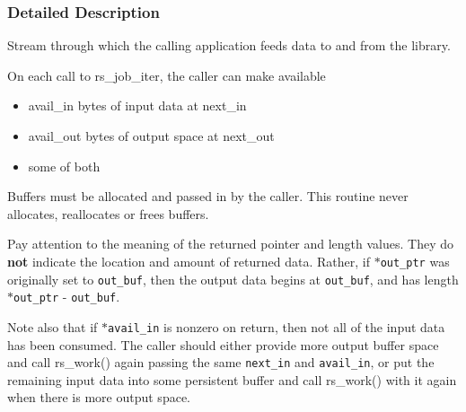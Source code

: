 \subsubsection{Detailed Description}
Stream through which the calling application feeds data to and from the library. 

On each call to rs\_\-job\_\-iter, the caller can make available

\begin{itemize}
\item avail\_\-in bytes of input data at next\_\-in\item avail\_\-out bytes of output space at next\_\-out\item some of both\end{itemize}


Buffers must be allocated and passed in by the caller. This routine never allocates, reallocates or frees buffers.

Pay attention to the meaning of the returned pointer and length values. They do {\bf not} indicate the location and amount of returned data. Rather, if {\tt $\ast$out\_\-ptr} was originally set to {\tt out\_\-buf}, then the output data begins at {\tt out\_\-buf}, and has length {\tt $\ast$out\_\-ptr} - {\tt out\_\-buf}.

Note also that if {\tt $\ast$avail\_\-in} is nonzero on return, then not all of the input data has been consumed. The caller should either provide more output buffer space and call rs\_\-work() again passing the same {\tt next\_\-in} and {\tt avail\_\-in}, or put the remaining input data into some persistent buffer and call rs\_\-work() with it again when there is more output space.

